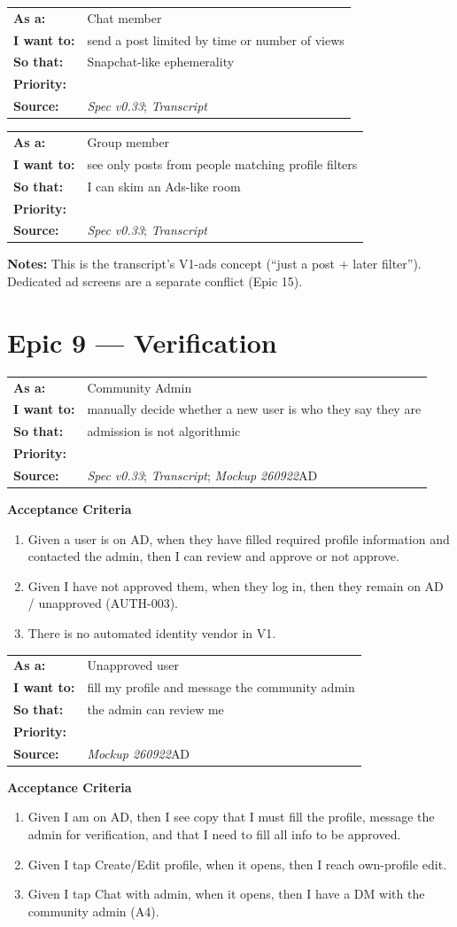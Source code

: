 \documentclass[11pt,a4paper]{article}
\makeatletter
\newcommand{\priPzero}{\colorbox{p0}{\makebox[4.6em]{\textcolor{white}{\scriptsize\bfseries P0 V1}}}}
\newcommand{\priPtwo}{\colorbox{p2}{\makebox[4.6em]{\textcolor{white}{\scriptsize\bfseries P2 Later}}}}
\newcommand{\srcSpec}{\textit{Spec v0.33}}
\newcommand{\srcTx}{\textit{Transcript}}
\newcommand{\srcMock}{\textit{Mockup 260922}}
\newenvironment{story}[1]{%
  \Needspace{10\baselineskip}%
  \vspace{0.7em}%
  \noindent
  \colorbox{navy}{\makebox[\dimexpr\textwidth-2\fboxsep\relax][l]{\textcolor{white}{\bfseries\ #1}}}%
  \par\vspace{0.35em}%
}{\par\vspace{0.55em}}
\newcommand{\storymeta}[5]{%
  \noindent
  \begin{tabularx}{\textwidth}{@{}>{\bfseries}l X@{}}
    As a: & #1 \\
    I want to: & #2 \\
    So that: & #3 \\
    Priority: & #4 \\
    Source: & #5 \\
  \end{tabularx}
  \par\vspace{0.3em}
}
\newcommand{\achead}{\noindent\textbf{Acceptance Criteria}\par}
\newcommand{\notes}[1]{\noindent\textbf{Notes:} #1\par}
\makeatother
\begin{document}
\begin{story}{POST-013 --- Temporary / limited-view posts later}
\storymeta{Chat member}{send a post limited by time or number of views}{Snapchat-like ephemerality}{\priPtwo}{\srcSpec; \srcTx}
\end{story}

\begin{story}{POST-014 --- Filter group posts by profile parameters later}
\storymeta{Group member}{see only posts from people matching profile filters}{I can skim an Ads-like room}{\priPtwo}{\srcSpec; \srcTx}
\notes{This is the transcript's V1-ads concept (``just a post + later filter''). Dedicated ad screens are a separate conflict (Epic 15).}
\end{story}

\section{Epic 9 --- Verification}

\begin{story}{VERIFY-001 --- Manual admin verification of new users}
\storymeta{Community Admin}{manually decide whether a new user is who they say they are}{admission is not algorithmic}{\priPzero}{\srcSpec; \srcTx; \srcMock AD}
\achead
\begin{enumerate}
  \item Given a user is on AD, when they have filled required profile information and contacted the admin, then I can review and approve or not approve.
  \item Given I have not approved them, when they log in, then they remain on AD / unapproved (AUTH-003).
  \item There is no automated identity vendor in V1.
\end{enumerate}
\end{story}

\begin{story}{VERIFY-002 --- Unapproved user fills profile and DMs the admin}
\storymeta{Unapproved user}{fill my profile and message the community admin}{the admin can review me}{\priPzero}{\srcMock AD}
\achead
\begin{enumerate}
  \item Given I am on AD, then I see copy that I must fill the profile, message the admin for verification, and that I need to fill all info to be approved.
  \item Given I tap Create/Edit profile, when it opens, then I reach own-profile edit.
  \item Given I tap Chat with admin, when it opens, then I have a DM with the community admin (A4).
\end{enumerate}
\end{story}
\end{document}
